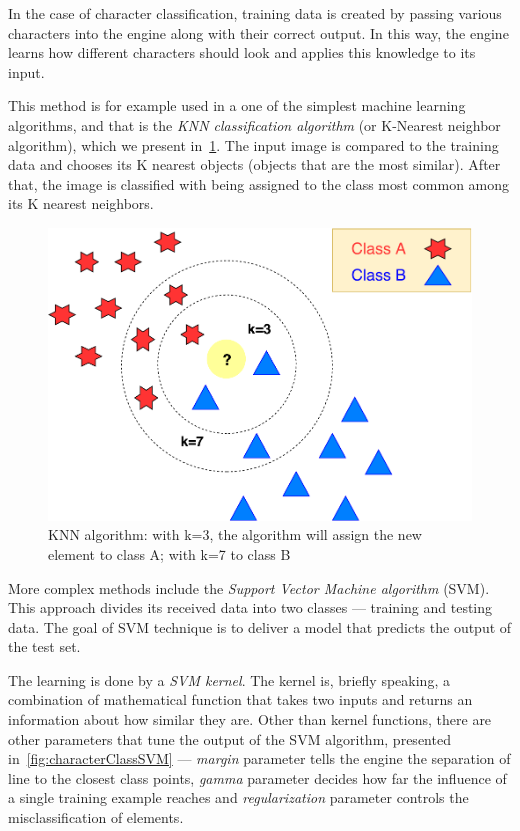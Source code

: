 In the case of character classification, training data is created by passing various characters into the engine along with their correct output. In this way, the engine learns how different characters should look and applies this knowledge to its input.

This method is for example used in a one of the simplest machine learning algorithms, and that is the \emph{KNN classification algorithm} (or K-Nearest neighbor algorithm), which we present in~\cref{fig:characterClassKNN}. The input image is compared to the training data and chooses its K nearest objects (objects that are the most similar). After that, the image is classified with being assigned to the class most common among its K nearest neighbors.

\begin{figure}[t]
\centering
\includegraphics[width=0.7\linewidth]{img/characterClassification/knn.pdf}
\caption{KNN algorithm: with k=3, the algorithm will assign the new element to class A; with k=7 to class B } \label{fig:characterClassKNN}
\end{figure}

More complex methods include the \emph{Support Vector Machine algorithm} (SVM). This approach divides its received data into two classes --- training and testing data. The goal of SVM technique is to deliver a model that predicts the output of the test set.

The learning is done by a \emph{SVM kernel}. The kernel is, briefly speaking, a combination of mathematical function that takes two inputs and returns an information about how similar they are. Other than kernel functions, there are other parameters that tune the output of the SVM algorithm, presented in~\cref{fig:characterClassSVM} --- \emph{margin} parameter tells the engine the separation of line to the closest class points, \emph{gamma} parameter decides how far the influence of a single training example reaches and \emph{regularization} parameter controls the misclassification of elements.

